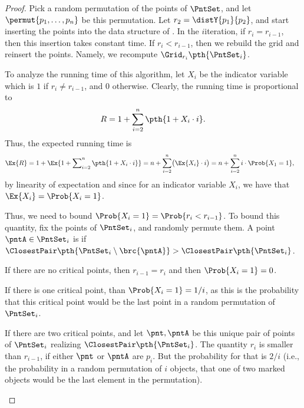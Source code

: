 \begin{proof}
    Pick a random permutation of the points of $\PntSet$, and let
    $\permut{p_1,\ldots, p_n}$ be this permutation. Let
    $r_2= \distY{p_1}{p_2}$, and start inserting the points into the
    data structure of . In the $i$\th iteration, if
    $r_{i} =r_{i-1}$, then this insertion takes constant time. If
    $r_{i} < r_{i-1}$, then we rebuild the grid and reinsert the
    points.  Namely, we recompute $\Grid_{r_i}\pth{\PntSet_i}$.

    To analyze the running time of this algorithm, let $X_i$ be the
    indicator variable which is $1$ if $r_i \ne r_{i-1}$, and $0$
    otherwise. Clearly, the running time is proportional to 
    \[
    R = 
    1 + \sum_{i=2}^n \pth{1 + X_i \cdot i}.
    \]
    Thus, the expected running time is
    \begin{align*}
      \Ex{ \bigl. R} %
      &=%
        1 +
        \Ex{1 + \sum\nolimits_{i=2}^n \pth{1 + X_i \cdot i}}
        = n + \sum_{i=2}^n \bigl( \Ex{X_i} \cdot i \bigr)
        = n + \sum_{i=2}^n i \cdot \Prob{X_1 = 1},
    \end{align*}
    by linearity of expectation and since for an indicator variable
    $X_i$, we have that $\Ex{X_i} = \Prob{X_i = 1}$.

    
    Thus, we need to bound $\Prob{ X_i=1} = \Prob{r_i < r_{i-1}}$. To
    bound this quantity, fix the points of $\PntSet_i$, and randomly
    permute them. A point $\pntA \in \PntSet_i$ is  if
    $\ClosestPair\pth{ \PntSet_i \setminus \brc{\pntA}} >
    \ClosestPair\pth{\PntSet_i}$.
    \begin{compactenumA}
        \item If there are no critical points, then $r_{i-1} = r_i$
        and then $\Prob{X_i=1}= 0$.

        \smallskip%
        \item If there is one critical point, than $\Prob{X_i=1}=1/i$,
        as this is the probability that this critical point would be
        the last point in a random permutation of $\PntSet_i$.

        \smallskip%
        \item If there are two critical points, and let $\pnt,\pntA$
        be this unique pair of points of $\PntSet_i$ realizing
        $\ClosestPair\pth{\PntSet_i}$. The quantity $r_i$ is smaller
        than $r_{i-1}$, if either $\pnt$ or $\pntA$ are $p_i$. But the
        probability for that is $2/i$ (i.e., the probability in a
        random permutation of $i$ objects, that one of two marked
        objects would be the last element in the permutation).


\end{compactenumA}
\end{proof}
